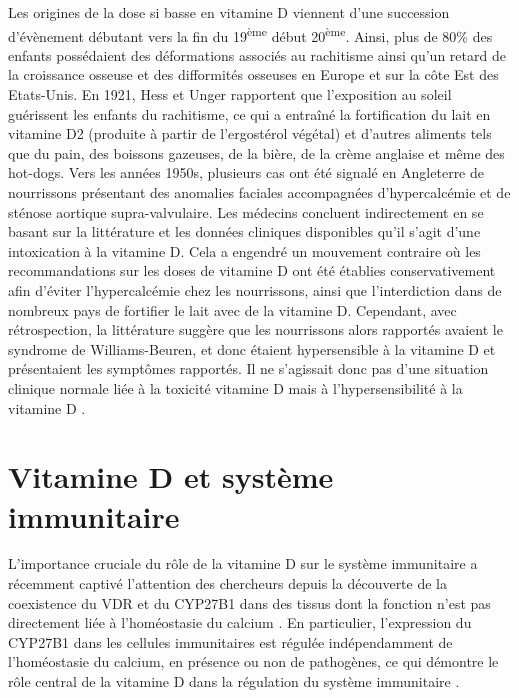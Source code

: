 \documentclass[
  a4paper,
  DIV=11,
  numbers=noendperiod,
  listof=totoc]{scrreprt}
\begin{document}
Les origines de la dose si basse en vitamine D viennent d'une succession
d'évènement débutant vers la fin du 19\textsuperscript{ème} début
20\textsuperscript{ème}. Ainsi, plus de 80\% des enfants possédaient des
déformations associés au rachitisme ainsi qu'un retard de la croissance
osseuse et des difformités osseuses en Europe et sur la côte Est des
Etats-Unis. En 1921, Hess et Unger rapportent que l'exposition au soleil
guérissent les enfants du rachitisme, ce qui a entraîné la fortification
du lait en vitamine D2 (produite à partir de l'ergostérol végétal) et
d'autres aliments tels que du pain, des boissons gazeuses, de la bière,
de la crème anglaise et même des hot-dogs. Vers les années 1950s,
plusieurs cas ont été signalé en Angleterre de nourrissons présentant
des anomalies faciales accompagnées d'hypercalcémie et de sténose
aortique supra-valvulaire. Les médecins concluent indirectement en se
basant sur la littérature et les données cliniques disponibles qu'il
s'agit d'une intoxication à la vitamine D. Cela a engendré un mouvement
contraire où les recommandations sur les doses de vitamine D ont été
établies conservativement afin d'éviter l'hypercalcémie chez les
nourrissons, ainsi que l'interdiction dans de nombreux pays de fortifier
le lait avec de la vitamine D. Cependant, avec rétrospection, la
littérature suggère que les nourrissons alors rapportés avaient le
syndrome de Williams-Beuren, et donc étaient hypersensible à la vitamine
D et présentaient les symptômes rapportés. Il ne s'agissait donc pas
d'une situation clinique normale liée à la toxicité vitamine D mais à
l'hypersensibilité à la vitamine D \autocite{Holick.2015}.

\newpage{}

\hypertarget{vitamine-d-et-systuxe8me-immunitaire}{%
\chapter{Vitamine D et système
immunitaire}\label{vitamine-d-et-systuxe8me-immunitaire}}

L'importance cruciale du rôle de la vitamine D sur le système
immunitaire a récemment captivé l'attention des chercheurs depuis la
découverte de la coexistence du \ac{VDR} et du \ac{CYP27B1} dans des
tissus dont la fonction n'est pas directement liée à l'homéostasie du
calcium \autocite{Zehnder.2001}. En particulier, l'expression du
\ac{CYP27B1} dans les cellules immunitaires est régulée indépendamment
de l'homéostasie du calcium, en présence ou non de pathogènes, ce qui
démontre le rôle central de la vitamine D dans la régulation du système
immunitaire \autocite{White.2022}.
\end{document}
